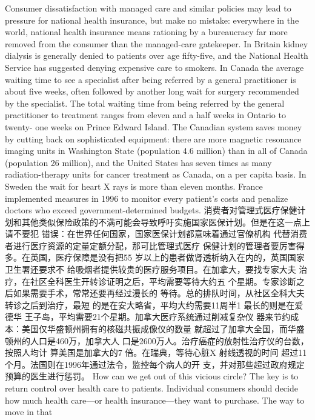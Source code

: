 \begin{paracol}{2}
\switchcolumn*
Consumer dissatisfaction with managed care and similar
policies may lead to pressure for national health insurance, but
make no mistake: everywhere in the world, national health insurance means rationing by a bureaucracy far more removed
from the consumer than the managed-care gatekeeper. In
Britain kidney dialysis is generally denied to patients over age
fifty-five, and the National Health Service has suggested denying expensive care to smokers. In Canada the average waiting
time to see a specialist after being referred by a general practitioner is about five weeks, often followed by another long wait
for surgery recommended by the specialist. The total waiting
time from being referred by the general practitioner to treatment ranges from eleven and a half weeks in Ontario to twenty-
one weeks on Prince Edward Island. The Canadian system saves
money by cutting back on sophisticated equipment: there are
more magnetic resonance imaging units in Washington State
(population 4.6 million) than in all of Canada (population 26
million), and the United States has seven times as many radiation-therapy units for cancer treatment as Canada, on a per
capita basis. In Sweden the wait for heart X rays is more than
eleven months. France implemented measures in 1996 to monitor every patient's costs and penalize doctors who exceed government-determined budgets.
\switchcolumn
消费者对管理式医疗保健计划和其他类似保险政策的不满可能会导致呼吁实施国家医保计划。但是在这一点上请不要犯
错误：在世界任何国家，国家医保计划都意味着通过官僚机构
代替消费者进行医疗资源的定量定额分配，那可比管理式医疗
保健计划的管理者要厉害得多。在英国，医疗保障是没有把55
岁以上的患者做肾透析纳入在内的，英国国家卫生署还要求不
给吸烟者提供较贵的医疗服务项目。在加拿大，要找专家大夫
治疗，在社区全科医生开转诊证明之后，平均需要等待大约五
个星期。专家诊断之后如果需要手术，常常还要再经过漫长的
等待。总的排队时间，从社区全科大夫转诊之后到治疗，最短
的是在安大略省，平均大约需要11周半1 最长的则是在爱德华
王子岛，平均需要21个星期。加拿大医疗系统通过削减复杂仪
器来节约成本：美国仅华盛顿州拥有的核磁共振成像仪的数量
就超过了加拿大全国，而华盛顿州的人口是460万，加拿大人
口是2600万人。治疗癌症的放射性治疗仪的台数，按照人均计
算美国是加拿大的7 倍。在瑞典，等待心脏X 射线透视的时间
超过11个月。法国则在1996年通过法令，监控每个病人的开
支，并对那些超过政府规定预算的医生进行惩罚。
\switchcolumn*
How can we get out of this vicious circle? The key is to return control over health care to patients. Individual consumers should decide how much health care---or health
insurance---they want to purchase. The way to move in that

\end{paracol}
